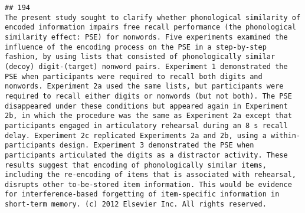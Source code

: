 \documentclass[
  english,
  man]{apa6}
\begin{document}
\begin{verbatim}
## 194                                                                                                                                                                                                                                                                                                                                                                                                                                                                                                                                                                                                                                                                                                                                                                                                                                                                                                                                                                                                                                                                                                                                                                                                                                                                                 The present study sought to clarify whether phonological similarity of encoded information impairs free recall performance (the phonological similarity effect: PSE) for nonwords. Five experiments examined the influence of the encoding process on the PSE in a step-by-step fashion, by using lists that consisted of phonologically similar (decoy) digit-(target) nonword pairs. Experiment 1 demonstrated the PSE when participants were required to recall both digits and nonwords. Experiment 2a used the same lists, but participants were required to recall either digits or nonwords (but not both). The PSE disappeared under these conditions but appeared again in Experiment 2b, in which the procedure was the same as Experiment 2a except that participants engaged in articulatory rehearsal during an 8 s recall delay. Experiment 2c replicated Experiments 2a and 2b, using a within-participants design. Experiment 3 demonstrated the PSE when participants articulated the digits as a distractor activity. These results suggest that encoding of phonologically similar items, including the re-encoding of items that is associated with rehearsal, disrupts other to-be-stored item information. This would be evidence for interference-based forgetting of item-specific information in short-term memory. (c) 2012 Elsevier Inc. All rights reserved.

\end{verbatim}
\end{document}
